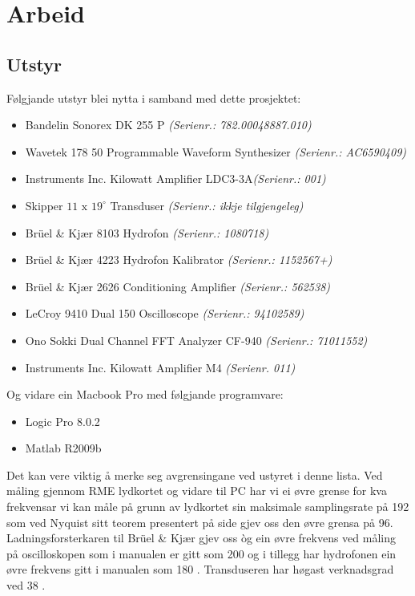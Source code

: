\section{Arbeid}
\subsection{Utstyr}
Følgjande utstyr blei nytta i samband med dette prosjektet:
\begin{itemize}
	\item Bandelin Sonorex DK 255 P \textit{(Serienr.: 782.00048887.010)}
	\item Wavetek 178 \unit{50}{\mega\hertz} Programmable Waveform Synthesizer \textit{(Serienr.: AC6590409)}
	\item Instruments Inc. Kilowatt Amplifier LDC3-3A\textit{(Serienr.: 001)}
	\item Skipper $11\text{ x }{19}^\circ$ Transduser \textit{(Serienr.: ikkje tilgjengeleg)}
	\item Brüel \& Kjær 8103 Hydrofon \textit{(Serienr.: 1080718)}
	\item Brüel \& Kjær 4223 Hydrofon Kalibrator \textit{(Serienr.: 1152567+)}
	\item Brüel \& Kjær 2626 Conditioning Amplifier \textit{(Serienr.: 562538)}
	\item LeCroy 9410 Dual \unit{150}{\mega\hertz} Oscilloscope \textit{(Serienr.: 94102589)}
	\item Ono Sokki Dual Channel FFT Analyzer CF-940 \textit{(Serienr.: 71011552)}
	\item Instruments Inc. Kilowatt Amplifier M4 \textit{(Serienr. 011)}
\end{itemize}

Og vidare ein Macbook Pro med følgjande programvare:

\begin{itemize}
	\item Logic Pro 8.0.2
	\item Matlab R2009b
\end{itemize}

Det kan vere viktig å merke seg avgrensingane ved ustyret i denne lista. Ved måling gjennom RME lydkortet og vidare til PC har vi ei øvre grense for kva frekvensar vi kan måle på grunn av lydkortet sin maksimale samplingsrate på \unit{192}{\kilo\hertz} som ved Nyquist sitt teorem presentert på side \pageref{nyquist} gjev oss den øvre grensa på \unit{96}{\kilo\hertz}. Ladningsforsterkaren til Brüel \& Kjær gjev oss òg ein øvre frekvens ved måling på oscilloskopen som i manualen er gitt som \unit{200}{\kilo\hertz} \cite{ladnforsterker} og i tillegg har hydrofonen ein øvre frekvens gitt i manualen som \unit{180}{\kilo\hertz} \cite{hydrofon}. Transduseren har høgast verknadsgrad ved \unit{38}{\kilo\hertz} \cite{skipper}. 

